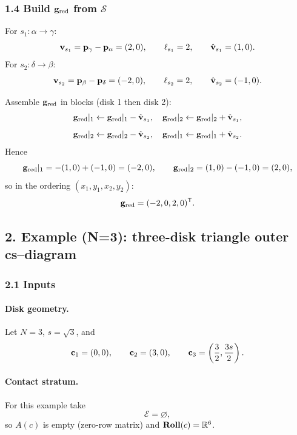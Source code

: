 \documentclass[12pt,letterpaper]{amsart}
\theoremstyle{definition}
\theoremstyle{remark}
\newcommand{\Roll}{\text{\rm \bf Roll}}
\newcommand{\R}{{\mathbb{R}}}
\begin{document}
\subsubsection*{1.4 Build ${\bf g}_{\rm red}$ from $\mathcal S$}

For $s_1:\alpha\to\gamma$:
\[
{\bf v}_{s_1}={\bf p}_\gamma-{\bf p}_\alpha=(2,0),\qquad
\ell_{s_1}=2,\qquad
\hat{\bf v}_{s_1}=(1,0).
\]
For $s_2:\delta\to\beta$:
\[
{\bf v}_{s_2}={\bf p}_\beta-{\bf p}_\delta=(-2,0),\qquad
\ell_{s_2}=2,\qquad
\hat{\bf v}_{s_2}=(-1,0).
\]

Assemble ${\bf g}_{\rm red}$ in blocks (disk 1 then disk 2):
\[
{\bf g}_{\rm red}|_{1}\gets {\bf g}_{\rm red}|_{1}-\hat{\bf v}_{s_1},\quad
{\bf g}_{\rm red}|_{2}\gets {\bf g}_{\rm red}|_{2}+\hat{\bf v}_{s_1},
\]
\[
{\bf g}_{\rm red}|_{2}\gets {\bf g}_{\rm red}|_{2}-\hat{\bf v}_{s_2},\quad
{\bf g}_{\rm red}|_{1}\gets {\bf g}_{\rm red}|_{1}+\hat{\bf v}_{s_2}.
\]
Hence
\[
{\bf g}_{\rm red}|_1=-(1,0)+(-1,0)=(-2,0),
\qquad
{\bf g}_{\rm red}|_2=(1,0)-(-1,0)=(2,0),
\]
so in the ordering $(x_1,y_1,x_2,y_2)$:
\[
{\bf g}_{\rm red}=(-2,0,2,0)^\mathsf T.
\]

\subsection{2. Example (N=3): three-disk triangle outer cs--diagram}

\subsubsection*{2.1 Inputs}

\paragraph{Disk geometry.}
Let $N=3$, $s=\sqrt{3}$, and
\[
{\bf c}_1=(0,0),\qquad {\bf c}_2=(3,0),\qquad {\bf c}_3=\left(\frac32,\frac{3s}{2}\right).
\]

\paragraph{Contact stratum.}
For this example take
\[
\mathcal E=\varnothing,
\]
so $A(c)$ is empty (zero-row matrix) and $\Roll(c)=\R^{6}$.
\end{document}
